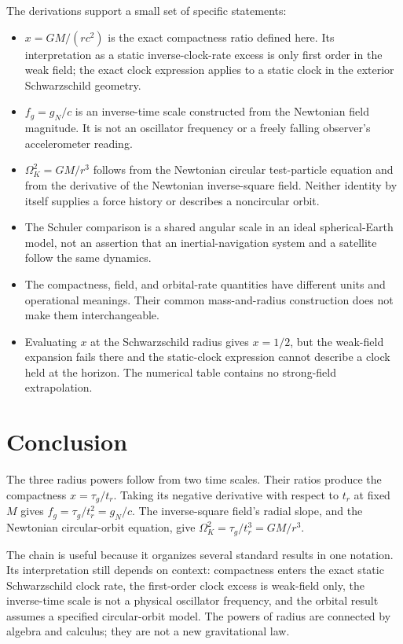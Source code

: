 \documentclass[12pt]{article}
\begin{document}
The derivations support a small set of specific statements:
\begin{itemize}[leftmargin=*]
  \item $x=GM/(rc^2)$ is the exact compactness ratio defined here. Its interpretation as a static inverse-clock-rate excess is only first order in the weak field; the exact clock expression applies to a static clock in the exterior Schwarzschild geometry.
  \item $f_g=g_N/c$ is an inverse-time scale constructed from the Newtonian field magnitude. It is not an oscillator frequency or a freely falling observer's accelerometer reading.
  \item $\Omega_K^2=GM/r^3$ follows from the Newtonian circular test-particle equation and from the derivative of the Newtonian inverse-square field. Neither identity by itself supplies a force history or describes a noncircular orbit.
  \item The Schuler comparison is a shared angular scale in an ideal spherical-Earth model, not an assertion that an inertial-navigation system and a satellite follow the same dynamics.
  \item The compactness, field, and orbital-rate quantities have different units and operational meanings. Their common mass-and-radius construction does not make them interchangeable.
  \item Evaluating $x$ at the Schwarzschild radius gives $x=1/2$, but the weak-field expansion fails there and the static-clock expression cannot describe a clock held at the horizon. The numerical table contains no strong-field extrapolation.
\end{itemize}

\section{Conclusion}

The three radius powers follow from two time scales. Their ratios produce the compactness $x=\tau_g/t_r$. Taking its negative derivative with respect to $t_r$ at fixed $M$ gives $f_g=\tau_g/t_r^2=g_N/c$. The inverse-square field's radial slope, and the Newtonian circular-orbit equation, give $\Omega_K^2=\tau_g/t_r^3=GM/r^3$.

The chain is useful because it organizes several standard results in one notation. Its interpretation still depends on context: compactness enters the exact static Schwarzschild clock rate, the first-order clock excess is weak-field only, the inverse-time scale is not a physical oscillator frequency, and the orbital result assumes a specified circular-orbit model. The powers of radius are connected by algebra and calculus; they are not a new gravitational law.
\end{document}

